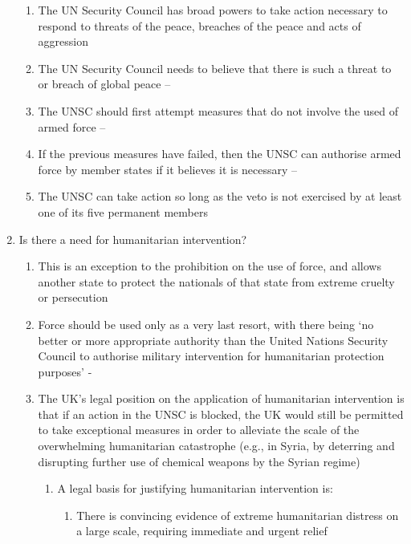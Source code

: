 \begin{enumerate}
    \begin{enumerate}
        \item The UN Security Council has broad powers to take action necessary to respond to threats of the peace, breaches of the peace and acts of aggression
        \item The UN Security Council needs to believe that there is such a threat to or breach of global peace -- 
        \item The UNSC should first attempt measures that do not involve the used of armed force --  
        \item If the previous measures have failed, then the UNSC can authorise armed force by member states if it believes it is necessary --  
        \item The UNSC can take action so long as the veto is not exercised by at least one of its five permanent members
    \end{enumerate}
    \item Is there a need for humanitarian intervention?
    \begin{enumerate}
        \item This is an exception to the prohibition on the use of force, and allows another state to protect the nationals of that state from extreme cruelty or persecution
        \item Force should be used only as a very last resort, with there being `no better or more appropriate authority than the United Nations Security Council to authorise military intervention for humanitarian protection purposes' - 
        \item The UK's legal position on the application of humanitarian intervention is that if an action in the UNSC is blocked, the UK would still be permitted to take exceptional measures in order to alleviate the scale of the overwhelming humanitarian catastrophe (e.g., in Syria, by deterring and disrupting further use of chemical weapons by the Syrian regime)
        \begin{enumerate}
            \item A legal basis for justifying humanitarian intervention is:
            \begin{enumerate}
                \item There is convincing evidence of extreme humanitarian distress on a large scale, requiring immediate and urgent relief

\end{enumerate}
\end{enumerate}
\end{enumerate}
\end{enumerate}
